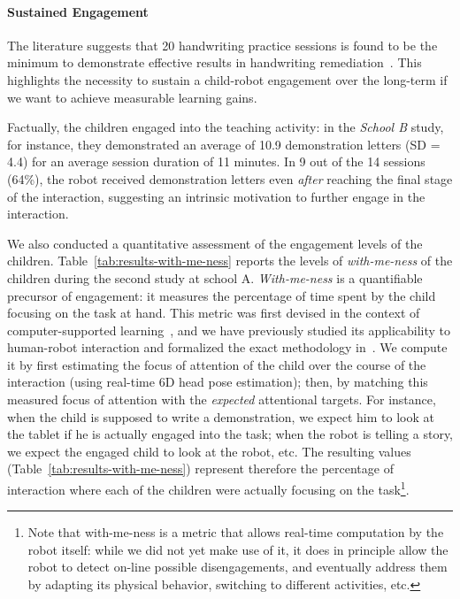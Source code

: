 \documentclass{article}
\begin{document}
\paragraph{Sustained Engagement}

The literature suggests that 20 handwriting practice sessions is found to be the
minimum to demonstrate effective results in handwriting
remediation~\cite{Hoy2011}. This highlights the necessity to sustain a
child-robot engagement over the long-term if we want to achieve measurable
learning gains.

Factually, the children engaged into the teaching activity: in the
\textit{School B} study, for instance, they demonstrated an average of 10.9
demonstration letters (SD = 4.4) for an average session duration of 11 minutes.
In 9 out of the 14 sessions (64\%), the robot received demonstration letters
even \emph{after} reaching the final stage of the interaction, suggesting an
intrinsic motivation to further engage in the interaction.


We also conducted a quantitative assessment of the engagement levels of the
children. Table~\ref{tab:results-with-me-ness} reports the levels of
\emph{with-me-ness} of the children during the second study at school A.
\emph{With-me-ness} is a quantifiable precursor of engagement: it measures the
percentage of time spent by the child focusing on the task at hand. This metric
was first devised in the context of computer-supported
learning~\cite{sharma2014me}, and we have previously studied its applicability
to human-robot interaction and formalized the exact methodology
in~\cite{lemaignan2016realtime}. We compute it by first estimating the focus of
attention of the child over the course of the interaction (using real-time 6D
head pose estimation); then, by matching this measured focus of attention
with the \emph{expected} attentional targets. For instance, when the child is supposed
to write a demonstration, we expect him to look at the tablet if he is actually
engaged into the task; when the robot is telling a story,
we expect the engaged child to look at the robot, etc. The resulting values
(Table~\ref{tab:results-with-me-ness}) represent therefore the percentage of
interaction where each of the children were actually focusing on the task\footnote{Note that
with-me-ness is a metric that allows real-time computation by the robot
itself: while we did not yet make use of it, it does in principle allow the
robot to detect on-line possible disengagements, and eventually address them
by adapting its physical behavior, switching to different activities, etc.}.
\end{document}

